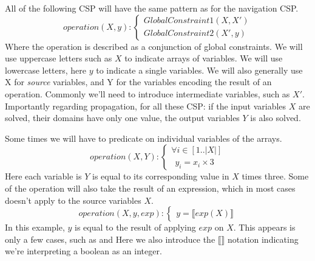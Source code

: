 All of the following CSP will have the same pattern as for the navigation CSP.
\begin{equation}\label{csp:operationGC}
    operation(X,y):
    \begin{cases}
        GlobalConstraint1(X,X')\\
        GlobalConstraint2(X',y)
    \end{cases}
\end{equation}
Where the operation is described as a conjunction of global constraints.
We will use uppercase letters such as $X$ to indicate arrays of variables.
We will use lowercase letters, here $y$ to indicate a single variables.
We will also generally use X for \textit{source} variables, and Y for the variables encoding the result of an operation.
Commonly we'll need to introduce intermediate variables, such as $X'$.
Importantly regarding propagation, for all these CSP: if the input variables $X$ are solved, their domains have only one value, the output variables $Y$ is also solved.

Some times we will have to predicate on individual variables of the arrays.
\begin{equation}\label{csp:operationI}
    operation(X,Y):
    \begin{cases}
        \forall i \in [1..|X|]\\
        ~~ y_i = x_i \times 3
    \end{cases}
\end{equation}
Here each variable is $Y$ is equal to its corresponding value in $X$ times three.
Some of the operation will also take the result of an expression, which in most cases doesn't apply to the source variables $X$.
\begin{equation}\label{csp:operationEXP}
    operation(X,y,exp):
    \begin{cases}
        y = \llbracket exp(X)\rrbracket
    \end{cases}
\end{equation}
In this example, $y$ is equal to the result of applying $exp$ on $X$.
This appears is only a few cases, such as  and 
Here we also introduce the $\llbracket \rrbracket$ notation indicating we're interpreting a boolean as an integer.

\newpage
